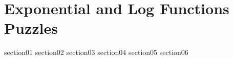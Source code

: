 \chapter{Exponential and Log Functions Puzzles}

{section01}
{section02}
{section03}
{section04}
{section05}
{section06}